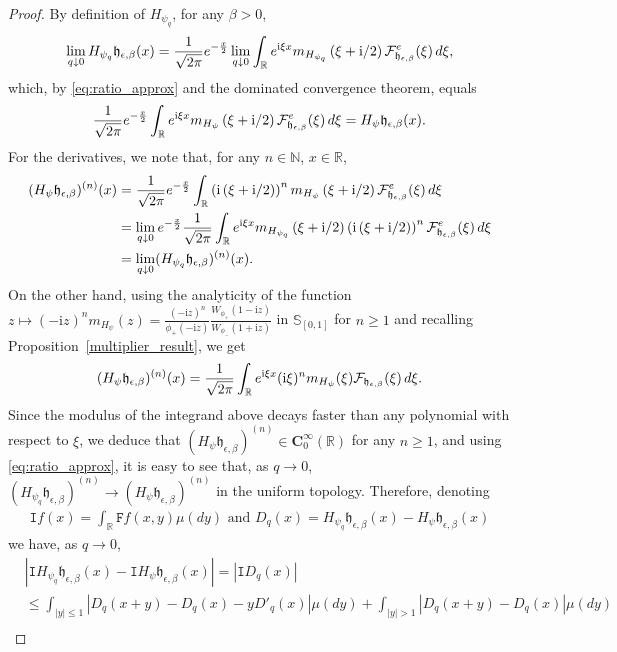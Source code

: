 \documentclass[12pt]{amsart}
\numberwithin{equation}{section}
\newcommand{\bb}{\mathbb}
\newcommand{\cc}{\mathcal}
\renewcommand{\ge}{\geqslant}
\renewcommand{\le}{\leqslant}
\newcommand{\mf}{\mathfrak}
\newcommand{\ttt}{\mathtt}
\newcommand{\fou}{\mathcal{F}}
\newcommand{\sqpi}{\frac{1}{\sqrt{2\pi}}}
\newcommand{\Hpsi}{H_\psi}
\newcommand{\fouho}{\cc{F}^{e}}
\newcommand{\C}{\mathbf{C}}
\newcommand{\eps}{\epsilon}
\newcommand{\heb}{\mf{h}_{\eps,\beta}}
\renewcommand{\i}{\mathrm{i}}
\theoremstyle{definition}
\theoremstyle{assump}
\theoremstyle{remark}
\begin{document}
{\begin{proof}
By definition of $H_{\psi_q}$, for any $\beta>0$,
\begin{align*}
\lim_{q\downarrow 0}H_{\psi_q}\heb(x)=\frac{1}{\sqrt{2\pi}}e^{-\frac{x}{2}}\lim_{q\downarrow 0}\int_\bb{R} e^{{\rm{i}}\xi   x}m_{H_{\psi_q}}\left(\xi+{\rm{i}}/2\right)\fouho_{\heb}(\xi)\,d\xi,
\end{align*}
which, by \eqref{eq:ratio_approx} and the dominated convergence theorem, equals
$$\frac{1}{\sqrt{2\pi}}e^{-\frac{x}{2}}\int_\bb{R} e^{{\rm{i}}\xi   x}m_{\Hpsi}\left(\xi+\i/2\right)\fouho_{\heb}(\xi)\,d\xi=\Hpsi\heb(x). $$
For the derivatives, we note that, for any $n\in\bb{N}$, $x\in\bb{R}$,
\begin{align*}
(\Hpsi\heb)^{(n)}(x)&=\sqpi e^{-\frac{x}{2}}\int_{\bb{R}} \left({\rm{i}}\left(\xi+\i/2\right)\right)^n m_{\Hpsi}\left(\xi+\i/2\right)\fouho_{\heb}(\xi)\,d\xi \\
&=\lim_{q\downarrow 0}e^{-\frac{x}{2}}\sqpi\int_\bb{R} e^{{\rm{i}}\xi   x} m_{H_{\psi_q}}\left(\xi+\i/2\right)\left({\rm{i}}\left(\xi+\i/2\right)\right)^n\fouho_{\heb}(\xi)\,d\xi \\
&=\lim_{q\downarrow 0}(H_{\psi_q}\heb)^{(n)}(x).
\end{align*}
On the other hand, using the analyticity of the function $z\mapsto (-\i z)^n m_{\Hpsi}(z)=\frac{(-\i z)^n}{\phi_+(-\i z)}\frac{W_{\phi_+}(1-\i z)}{W_{\phi_-}(1+\i z)}$ in $\bb{S}_{[0,1]}$ for $n\ge 1$ and recalling Proposition~\ref{multiplier_result}, we get
\begin{align*}
(\Hpsi\heb)^{(n)}(x)=\sqpi\int_\bb{R} e^{{\rm{i}}\xi   x} ({\rm{i}}\xi  )^nm_{\Hpsi}(\xi)\fou_{\heb}(\xi)\,d\xi.
\end{align*}
Since the modulus of the integrand above decays faster than any polynomial with respect to $\xi$, we deduce that $(\Hpsi\heb)^{(n)}\in \C^\infty_0(\bb{R})$ for any $n\ge 1$, and using \eqref{eq:ratio_approx}, it is easy to see that, as $q \to 0$, $(H_{\psi_q}\heb)^{(n)}\to (\Hpsi\heb)^{(n)}$ in the uniform topology. Therefore, denoting
\begin{align*}
\ttt{I}f(x)=\int_\bb{R}\ttt{F}f(x,y)\mu(dy) \text{  and  }
D_q(x)=H_{\psi_q}\heb(x)-\Hpsi\heb(x)
\end{align*}
we have, as $q \to 0$,
\begin{equation*}
\begin{aligned}
&|\ttt{I}H_{\psi_q}\heb(x)-\ttt{I}\Hpsi\heb(x)|=|\ttt{I}D_q(x)|\\
&\le \int_{|y|\le 1}\left|D_q(x+y)-D_q(x)-y D'_q(x)\right|\mu(dy)+\int_{|y|> 1} \left|D_q(x+y)-D_q (x)\right|\mu(dy)\\

\end{aligned}
\end{equation*}
\end{proof}}
\end{document}
